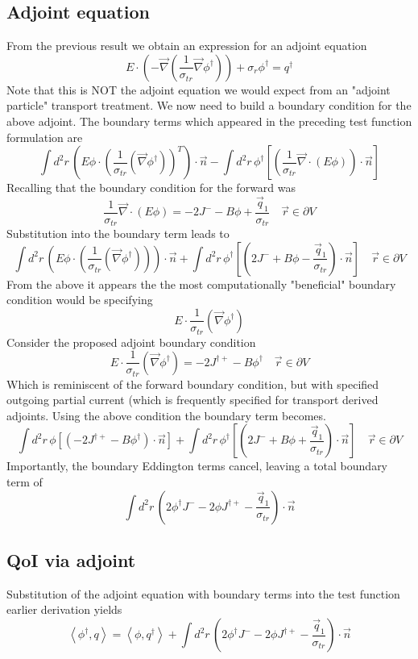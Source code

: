 \documentclass{article}
\newcommand{\vr}{\vec{r}}
\newcommand{\bra}{\left\langle}
\newcommand{\ket}{\right\rangle}
\newcommand{\vdiv}{\vec{\nabla} \cdot}
\newcommand{\vgrad}{\vec{\nabla}}
\begin{document}
\subsection{Adjoint equation}
From the previous result we obtain an expression for an adjoint equation
\[ 
E \cdot \left( - \vgrad \left( \frac{1}{\sigma_{tr}} \vgrad \phi^\dag \right) \right)
+ \sigma_r \phi^\dag
= q^\dag
\]
Note that this is NOT the adjoint equation we would expect from an "adjoint particle" transport treatment. We now need to build a boundary condition for the above adjoint. The boundary terms which appeared in the preceding test function formulation are 
\[
 \int d^2 r \, \left( E \phi \cdot \left( \frac{1}{ \sigma_{tr}} \left(  \vgrad \phi^\dag \right) \right)^T \right) \cdot \vec{n} 
- \int d^2 r \, \phi^\dag \left[ \left( \frac{1}{\sigma_{tr}} \vdiv \left( E \phi \right) \right) \cdot \vec{n} \right]
\]
Recalling that the boundary condition for the forward was
\[
\frac{1}{\sigma_{tr} } \vec{\nabla} \cdot \left(E \phi \right)  = - 2J^- - B \phi + \frac{\vec{q}_1}{\sigma_{tr} } \quad \vr \in \partial V
\]
Substitution into the boundary term leads to
\[
 \int d^2 r \, \left( E \phi \cdot \left( \frac{1}{ \sigma_{tr}} \left(  \vgrad \phi^\dag \right) \right) \right) \cdot \vec{n} 
+ \int d^2 r \, \phi^\dag \left[ \left( 2J^- + B \phi - \frac{\vec{q}_1}{\sigma_{tr} }  \right) \cdot \vec{n} \right] \quad \vr \in \partial V
\]
From the above it appears the the most computationally "beneficial" boundary condition would be specifying 
\[
E \cdot \frac{1}{ \sigma_{tr}} \left(  \vgrad \phi^\dag \right) 
\]
Consider the proposed adjoint boundary condition
\[
E \cdot \frac{1}{ \sigma_{tr}} \left(  \vgrad \phi^\dag \right) =  - 2J^{ \dag + } - B \phi^\dag  \quad \vr \in \partial V
\]
Which is reminiscent of the forward boundary condition, but with specified outgoing partial current (which is frequently specified for transport derived adjoints. Using the above condition the boundary term becomes. 
\[
 \int d^2 r \, \phi \left[ \left( - 2J^{ \dag + } - B \phi^\dag \right) \cdot \vec{n} \right]
+ \int d^2 r \, \phi^\dag \left[ \left( 2J^- + B \phi + \frac{\vec{q}_1}{\sigma_{tr} } \right) \cdot \vec{n} \right]  \quad \vr \in \partial V
\]
Importantly, the boundary Eddington terms cancel, leaving a total boundary term of
\[
 \int d^2 r \, \left(  2\phi^\dag J^- - 2\phi J^{ \dag + }  -  \frac{\vec{q}_1}{\sigma_{tr}} \right) \cdot \vec{n}
\]
\subsection{QoI via adjoint}
Substitution of the adjoint equation with boundary terms into the test function earlier derivation yields
\[
\bra \phi^\dag , q \ket = \bra \phi, q^\dag \ket +   \int d^2 r \, \left(  2\phi^\dag J^- - 2\phi J^{ \dag + }  -  \frac{\vec{q}_1}{\sigma_{tr}} \right) \cdot \vec{n}
\]
\end{document}
